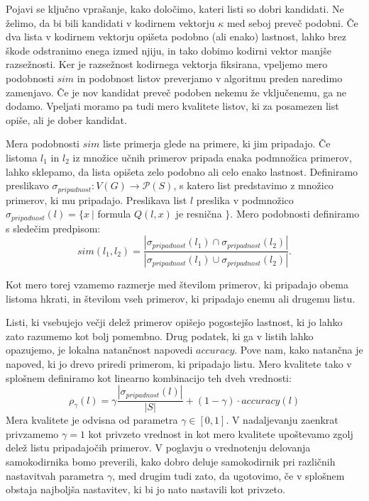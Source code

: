 \documentclass[12pt,a4paper,twoside]{article}
\theoremstyle{definition} %
\theoremstyle{plain} %
\numberwithin{equation}{section}  %
\begin{document}
Pojavi se ključno vprašanje, kako določimo, kateri listi so dobri kandidati. 
Ne želimo, da bi bili kandidati v kodirnem vektorju $\kappa$ med seboj preveč podobni. 
Če dva lista v kodirnem vektorju opišeta podobno (ali enako) lastnost, lahko brez škode odstranimo enega izmed njiju, in tako dobimo kodirni vektor manjše razsežnosti. 
Ker je razsežnost kodirnega vektorja fiksirana, vpeljemo mero podobnosti $sim$ in podobnost listov preverjamo v algoritmu preden naredimo zamenjavo. 
Če je nov kandidat preveč podoben nekemu že vključenemu, ga ne dodamo.
Vpeljati moramo pa tudi mero kvalitete listov, ki za posamezen list opiše, ali je dober kandidat.

Mera podobnosti $sim$ liste primerja glede na primere, ki jim pripadajo. 
Če listoma $l_1$ in $l_2$ iz množice učnih primerov pripada enaka podmnožica primerov, lahko sklepamo, da lista opišeta zelo podobno ali celo enako lastnost.
Definiramo preslikavo $\sigma_{\mathit{pripadnost}}: V(G) \rightarrow \mathcal{P}(S)$, s katero list predstavimo z množico primerov, ki mu pripadajo.
Preslikava list $l$ preslika v podmnožico $\sigma_{\mathit{pripadnost}}(l) = \{x\ |$ formula $Q(l,x)$ je resnična $\}$.
Mero podobnosti definiramo s sledečim predpisom:
\[
	sim(l_1, l_2) = \frac{|\sigma_{pripadnost}(l_1) \cap \sigma_{pripadnost}(l_2)|}{|\sigma_{pripadnost}(l_1) \cup \sigma_{pripadnost}(l_2)|}.
\]

Kot mero torej vzamemo razmerje med številom primerov, ki pripadajo obema listoma hkrati, in številom vseh primerov, ki pripadajo enemu ali drugemu listu.

Listi, ki vsebujejo večji delež primerov opišejo pogostejšo lastnost, ki jo lahko zato razumemo kot bolj pomembno. 
Drug podatek, ki ga v listih lahko opazujemo, je lokalna natančnost napovedi $\mathit{accuracy}$.
Pove nam, kako natančna je napoved, ki jo drevo priredi primerom, ki pripadajo listu.
Mero kvalitete tako v splošnem definiramo kot linearno kombinacijo teh dveh vrednosti:
\[
\rho_{\gamma}(l) = \gamma \frac{|\sigma_{\mathit{pripadnost}}(l)|}{|S|} + (1-\gamma) \cdot \mathit{accuracy}(l)
\]
\label{mera-kvalitete}
Mera kvalitete je odvisna od parametra $\gamma \in [0,1]$.
V nadaljevanju zaenkrat privzamemo $\gamma = 1$ kot privzeto vrednost in kot mero kvalitete upoštevamo zgolj delež listu pripadajočih primerov.
V poglavju o vrednotenju delovanja samokodirnika bomo preverili, kako dobro deluje samokodirnik pri različnih nastavitvah parametra $\gamma$,
med drugim tudi zato, da ugotovimo, če v splošnem obstaja najboljša nastavitev, ki bi jo nato nastavili kot privzeto.
\end{document}

